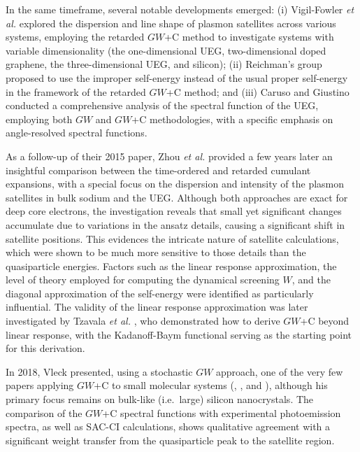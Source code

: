 \documentclass[aip,jcp,reprint,noshowkeys,superscriptaddress]{revtex4-2}
\begin{document}
In the same timeframe, several notable developments emerged: (i) Vigil-Fowler \textit{et al.} \cite{Vigil-Fowler_2016} explored the dispersion and line shape of plasmon satellites across various systems, employing the retarded $GW$+C method to investigate systems with variable dimensionality (the one-dimensional UEG, two-dimensional doped graphene, the three-dimensional UEG, and silicon); (ii) Reichman's group \cite{Mayers_2016} proposed to use the improper self-energy instead of the usual proper self-energy in the framework of the retarded $GW$+C method; and (iii) Caruso and Giustino conducted a comprehensive analysis of the spectral function of the UEG, employing both $GW$ and $GW$+C methodologies, with a specific emphasis on angle-resolved spectral functions. \cite{Caruso_2015a,Caruso_2015b,Caruso_2016a} 

As a follow-up of their 2015 paper, \cite{Zhou_2015} Zhou \textit{et al.} provided a few years later an insightful comparison between the time-ordered and retarded cumulant expansions, with a special focus on the dispersion and intensity of the plasmon satellites in bulk sodium and the UEG. \cite{Zhou_2018} Although both approaches are exact for deep core electrons, the investigation reveals that small yet significant changes accumulate due to variations in the ansatz details, causing a significant shift in satellite positions. This evidences the intricate nature of satellite calculations, which were shown to be much more sensitive to those details than the quasiparticle energies. Factors such as the linear response approximation, the level of theory employed for computing the dynamical screening $W$, and the diagonal approximation of the self-energy were identified as particularly influential. The validity of the linear response approximation was later investigated by Tzavala \textit{et al.} \cite{Tzavala_2020}, who demonstrated how to derive $GW$+C beyond linear response, with the Kadanoff-Baym functional serving as the starting point for this derivation.

In 2018, Vleck presented, using a stochastic $GW$ approach, \cite{Neuhauser_2014,Vlcek_2017} one of the very few papers applying $GW$+C to small molecular systems (, , and ), although his primary focus remains on bulk-like (i.e.~large) silicon nanocrystals. \cite{Vlcek_2018} The comparison of the $GW$+C spectral functions with experimental photoemission spectra, as well as SAC-CI calculations, \cite{Wasada_1989,Ishida_2002} shows qualitative agreement with a significant weight transfer from the quasiparticle peak to the satellite region.
\end{document}
